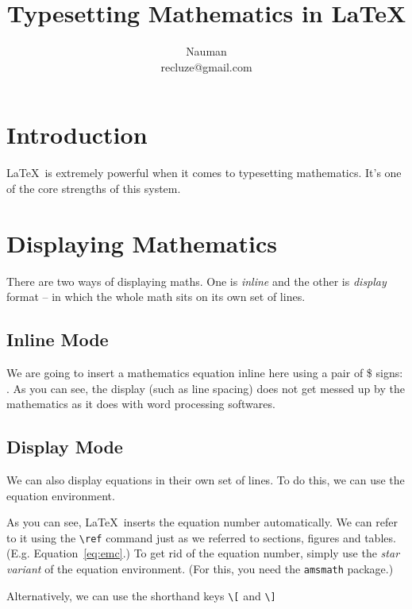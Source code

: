 \documentclass{article}
\begin{document}
\title{Typesetting Mathematics in \LaTeX}
\author{Nauman \\ recluze@gmail.com}
\maketitle


\section{Introduction} 
\LaTeX\ is extremely powerful when it comes to typesetting mathematics. It's one of the core strengths of this system. 

\section{Displaying Mathematics}
There are two ways of displaying maths. One is \emph{inline} and the other is \emph{display} format -- in which the whole math sits on its own set of lines.


\subsection{Inline Mode}
We are going to insert a mathematics equation inline here using a pair of \$ signs:    . As you can see, the display (such as line spacing) does not get messed up by the mathematics as it does with word processing softwares. 

\subsection{Display Mode}
We can also display equations in their own set of lines. To do this, we can use the equation environment. 

%

As you can see, \LaTeX\ inserts the equation number automatically. We can refer to it using the \verb|\ref| command just as we referred to sections, figures and tables. (E.g. Equation~\ref{eq:emc}.) To get rid of the equation number, simply use the \emph{star variant} of the equation environment. (For this, you need the \texttt{amsmath} package.)

%

Alternatively, we can use the shorthand keys \verb|\[| and \verb|\]|
\end{document}
